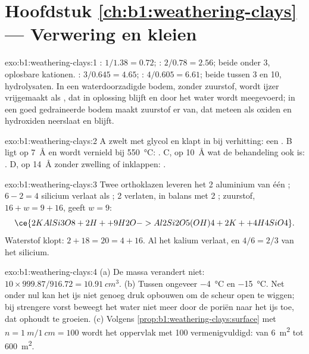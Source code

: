 \section*{Hoofdstuk \ref{ch:b1:weathering-clays} --- Verwering en kleien}

\begin{solution}{exo:b1:weathering-clays:1}
: $1/1.38 = 0.72$; : $2/0.78 = 2.56$; beide onder 3, oplosbare
kationen. : $3/0.645 = 4.65$; : $4/0.605 = 6.61$; beide tussen
3 en 10, hydrolysaten. In een waterdoorzadigde bodem, zonder zuurstof, wordt ijzer
vrijgemaakt als , dat in oplossing blijft en door het water wordt
meegevoerd; in een goed gedraineerde bodem maakt zuurstof er  van, dat meteen
als oxiden en hydroxiden neerslaat en blijft.
\end{solution}

\begin{solution}{exo:b1:weathering-clays:2}
A zwelt met glycol en klapt in bij verhitting: een . B ligt op
\SI{7}{\angstrom} en wordt vernield bij \SI{550}{\celsius}: . C, op
\SI{10}{\angstrom} wat de behandeling ook is: . D, op \SI{14}{\angstrom} zonder
zwelling of inklappen: .
\end{solution}

\begin{solution}{exo:b1:weathering-clays:3}
Twee orthoklazen leveren het 2 aluminium van één ; $6 - 2 = 4$ silicium
verlaat als ; 2  verlaten, in balans met 2 ; zuurstof,
$16 + w = 9 + 16$, geeft $w = 9$:
\[
  \ce{2 KAlSi3O8 + 2 H+ + 9 H2O -> Al2Si2O5(OH)4 + 2 K+ + 4 H4SiO4}.
\]
Waterstof klopt: $2 + 18 = 20 = 4 + 16$. Al het kalium verlaat, en $4/6 =
2/3$ van het silicium.
\end{solution}

\begin{solution}{exo:b1:weathering-clays:4}
(a) De massa verandert niet: $10 \times 999.87/916.72 = \qty{10.91}{cm^3}$.
(b) Tussen ongeveer \qty{-4}{\celsius} en \qty{-15}{\celsius}. Net onder nul kan het ijs
niet genoeg druk opbouwen om de scheur open te wiggen; bij strengere vorst beweegt het
water niet meer door de poriën naar het ijs toe, dat ophoudt te groeien. (c) Volgens
\cref{prop:b1:weathering-clays:surface} met $n = \qty{1}{m}/\qty{1}{cm} = 100$
wordt het oppervlak met 100 vermenigvuldigd: van \qty{6}{m^2} tot \qty{600}{m^2}.
\end{solution}

